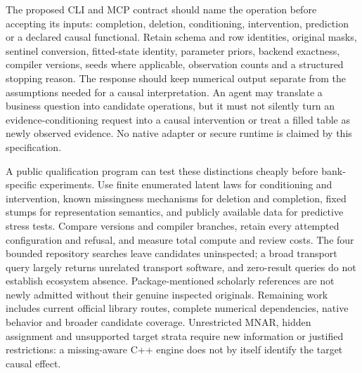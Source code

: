 The proposed CLI and MCP contract should name the operation before accepting its inputs: completion, deletion, conditioning, intervention, prediction or a declared causal functional. Retain schema and row identities, original masks, sentinel conversion, fitted-state identity, parameter priors, backend exactness, compiler versions, seeds where applicable, observation counts and a structured stopping reason. The response should keep numerical output separate from the assumptions needed for a causal interpretation. An agent may translate a business question into candidate operations, but it must not silently turn an evidence-conditioning request into a causal intervention or treat a filled table as newly observed evidence. No native adapter or secure runtime is claimed by this specification.\citep{exec25_ctm_choice}

A public qualification program can test these distinctions cheaply before bank-specific experiments. Use finite enumerated latent laws for conditioning and intervention, known missingness mechanisms for deletion and completion, fixed stumps for representation semantics, and publicly available data for predictive stress tests. Compare versions and compiler branches, retain every attempted configuration and refusal, and measure total compute and review costs. The four bounded repository searches leave candidates uninspected; a broad transport query largely returns unrelated transport software, and zero-result queries do not establish ecosystem absence. Package-mentioned scholarly references are not newly admitted without their genuine inspected originals. Remaining work includes current official library routes, complete numerical dependencies, native behavior and broader candidate coverage. Unrestricted MNAR, hidden assignment and unsupported target strata require new information or justified restrictions: a missing-aware C++ engine does not by itself identify the target causal effect.\citep{exec25_ctm_choice}
